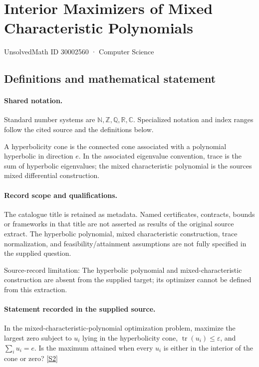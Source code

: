 \documentclass[11pt]{article}
\newcommand{\sref}[2]{\hyperlink{source:#1:#2}{[S#2]}}
\begin{document}
\setcounter{section}{30002559}
\section{Interior Maximizers of Mixed Characteristic Polynomials}\label{30002560}
{\small\sffamily UnsolvedMath ID 30002560 · Computer Science}
\subsection{Definitions and mathematical statement}

\paragraph{Shared notation.}Standard number systems are $\mathbb N,\mathbb Z,\mathbb Q,\mathbb R,\mathbb C$. Specialized notation and index ranges follow the cited source and the definitions below.


A hyperbolicity cone is the connected cone associated with a polynomial hyperbolic in direction $e$. In the associated eigenvalue convention, trace is the sum of hyperbolic eigenvalues; the mixed characteristic polynomial is the source\textquotesingle s mixed differential construction.
\paragraph{Record scope and qualifications.}
The catalogue title is retained as metadata. Named certificates, contracts, bounds or frameworks in that title are not asserted as results of the original source extract.
The hyperbolic polynomial, mixed characteristic construction, trace normalization, and feasibility/attainment assumptions are not fully specified in the supplied question.

Source-record limitation: The hyperbolic polynomial and mixed-characteristic construction are absent from the supplied target; its optimizer cannot be defined from this extraction.
\paragraph{Statement recorded in the supplied source.}
In the mixed-characteristic-polynomial optimization problem, maximize the largest zero subject to $u_i$ lying in the hyperbolicity cone, $\operatorname{tr}(u_i)\leq\varepsilon$, and $\sum_i u_i=e$. Is the maximum attained when every $u_i$ is either in the interior of the cone or zero? \sref{30002560}{2}
\end{document}
